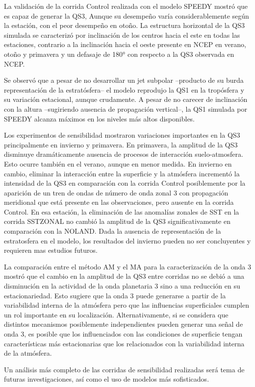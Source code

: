 \documentclass[spanish,a4paper,12pt,oneside]{book}
\begin{document}
La validación de la corrida Control realizada con el modelo SPEEDY
mostró que es capaz de generar la QS3, Aunque su desempeño varía
considerablemente según la estación, con el peor desempeño en otoño. La
estructura horizontal de la QS3 simulada se caracterizó por inclinación
de los centros hacia el este en todas las estaciones, contrario a la
inclinación hacia el oeste presente en NCEP en verano, otoño y primavera
y un defasaje de 180° con respecto a la QS3 observada en NCEP.

Se observó que a pesar de no desarrollar un jet subpolar --producto de
su burda representación de la estratósfera-- el modelo reprodujo la QS1
en la tropósfera y su variación estacional, aunque crudamente. A pesar
de no carecer de inclinación con la altura --sugiriendo ausencia de
propagación vertical--, la QS1 simulada por SPEEDY alcanza máximos en
los niveles más altos disponibles.

Los experimentos de sensibilidad mostraron variaciones importantes en la
QS3 principalmente en invierno y primavera. En primavera, la amplitud de
la QS3 disminuye dramáticamente ausencia de procesos de interacción
suelo-atmosfera. Esto ocurre también en el verano, aunque en menor
medida. En invierno en cambio, eliminar la interacción entre la
superficie y la atmósfera incrementó la intensidad de la QS3 en
comparación con la corrida Control posiblemente por la aparición de un
tren de ondas de número de onda zonal 3 con propagación meridional que
está presente en las observaciones, pero ausente en la corrida Control.
En esa estación, la eliminación de las anomalías zonales de SST en la
corrida SSTZONAL no cambió la amplitud de la QS3 significativamente en
comparación con la NOLAND. Dada la ausencia de representación de la
estratosfera en el modelo, los resultados del invierno pueden no ser
concluyentes y requieren mas estudios futuros.

La comparación entre el método AM y el MA para la caracterización de la
onda 3 mostró que el cambio en la amplitud de la QS3 entre corridas no
se debió a una disminución en la actividad de la onda planetaria 3 sino
a una reducción en su estacionariedad. Esto sugiere que la onda 3 puede
generarse a partir de la variabilidad interna de la atmósfera pero que
las influencias superficiales cumplen un rol importante en su
localización. Alternativamente, si se considera que distintos mecanismos
posiblemente independientes pueden generar una señal de onda 3, es
posible que los influenciados con las condiciones de superficie tengan
características más estacionarias que los relacionados con la
variabilidad interna de la atmósfera.

Un análisis más completo de las corridas de sensibilidad realizadas será
tema de futuras investigaciones, así como el uso de modelos más
sofisticados.

\renewcommand\bibname{Referencias}

\end{document}
